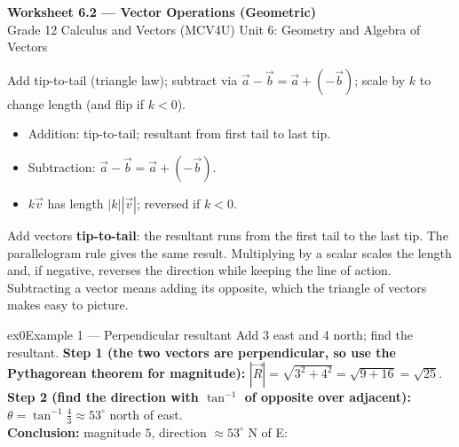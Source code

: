 \documentclass[11pt]{article}
\begin{document}
\begin{center}
{\LARGE\bfseries\color{titleblue}Worksheet 6.2 --- Vector Operations (Geometric)}\\[2pt]
{\small Grade 12 Calculus and Vectors (MCV4U) \textperiodcentered{} Unit 6: Geometry and Algebra of Vectors}
\end{center}

\begin{ideabox}
Add tip-to-tail (triangle law); subtract via $\vec a-\vec b=\vec a+(-\vec b)$; scale by $k$ to change length (and flip if $k<0$).
\begin{itemize}[leftmargin=*,itemsep=2pt]
  \item Addition: tip-to-tail; resultant from first tail to last tip.
  \item Subtraction: $\vec a-\vec b=\vec a+(-\vec b)$.
  \item $k\vec v$ has length $|k||\vec v|$; reversed if $k<0$.
\end{itemize}
\end{ideabox}

\begin{learnbox}
Add vectors \textbf{tip-to-tail}: the resultant runs from the first tail to the last tip. The parallelogram rule gives the same result.
Multiplying by a scalar scales the length and, if negative, reverses the direction while keeping the line of action.
Subtracting a vector means adding its opposite, which the triangle of vectors makes easy to picture.
\end{learnbox}


\begin{example}{ex0}{Example 1 --- Perpendicular resultant}
Add 3 east and 4 north; find the resultant.\soln
\textbf{Step 1 (the two vectors are perpendicular, so use the Pythagorean theorem for magnitude):} $|\vec R|=\sqrt{3^2+4^2}=\sqrt{9+16}=\sqrt{25}$.\\[3pt]
\textbf{Step 2 (find the direction with $\tan^{-1}$ of opposite over adjacent):} $\theta=\tan^{-1}\tfrac43\approx53^\circ$ north of east.\\[3pt]
\textbf{Conclusion:} magnitude $5$, direction $\approx53^\circ$ N of E:\begin{center}\end{center}
\end{example}
\end{document}
